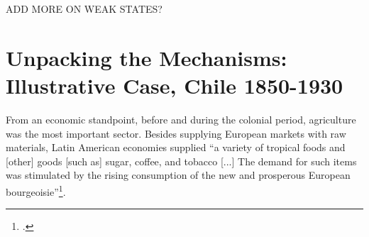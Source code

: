 \documentclass[onesided]{article}\usepackage[]{graphicx}\usepackage[]{color}
\begin{document}
{\color{red}ADD MORE ON WEAK STATES?}


\section{Unpacking the Mechanisms: Illustrative Case, Chile 1850-1930\label{unpacking}}


From an economic standpoint, before and during the colonial period, agriculture was the most important sector. Besides supplying European markets with raw materials, Latin American economies supplied ``a variety of tropical foods and [other] goods [such as] sugar, coffee, and tobacco [...] The demand for such items was stimulated by the rising consumption of the new and prosperous European bourgeoisie''\footnote{\citet[p. 74]{Marichal:1989bh}.}. 
\end{document}

